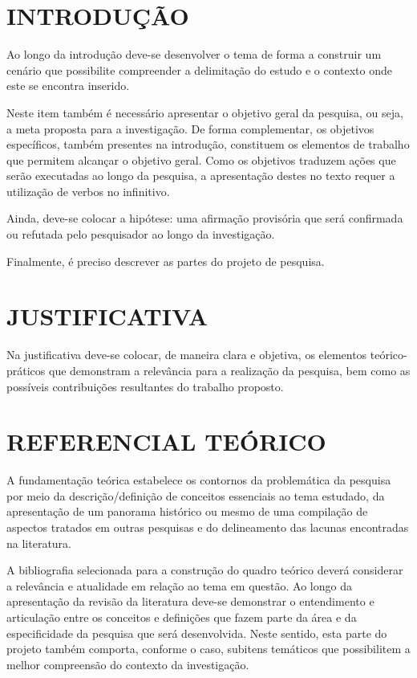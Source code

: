 \documentclass[12pt,a4paper]{article}
\begin{document}
\section{INTRODUÇÃO}
Ao longo da introdução deve-se desenvolver o tema de forma a construir um cenário que possibilite compreender a delimitação do estudo e o contexto onde este se encontra inserido.

Neste item também é necessário apresentar o objetivo geral da pesquisa, ou seja, a meta proposta para a investigação. De forma complementar, os objetivos específicos, também presentes na introdução, constituem os elementos de trabalho que permitem alcançar o objetivo geral. Como os objetivos traduzem ações que serão executadas ao longo da pesquisa, a apresentação destes no texto requer a utilização de verbos no infinitivo.

Ainda, deve-se colocar a hipótese: uma afirmação provisória que será confirmada ou refutada pelo pesquisador ao longo da investigação.

Finalmente, é preciso descrever as partes do projeto de pesquisa.

\section{JUSTIFICATIVA}
Na justificativa deve-se colocar, de maneira clara e objetiva, os elementos teórico-práticos que demonstram a relevância para a realização da pesquisa, bem como as possíveis contribuições resultantes do trabalho proposto.

\section{REFERENCIAL TEÓRICO}
A fundamentação teórica estabelece os contornos da problemática da pesquisa por meio da descrição/definição de conceitos essenciais ao tema estudado, da apresentação de um panorama histórico ou mesmo de uma compilação de aspectos tratados em outras pesquisas e do delineamento das lacunas encontradas na literatura.

A bibliografia selecionada para a construção do quadro teórico deverá considerar a relevância e atualidade em relação ao tema em questão. Ao longo da apresentação da revisão da literatura deve-se demonstrar o entendimento e articulação entre os conceitos e definições que fazem parte da área e da especificidade da pesquisa que será desenvolvida. Neste sentido, esta parte do projeto também comporta, conforme o caso, subitens temáticos que possibilitem a melhor compreensão do contexto da investigação.
\end{document}
